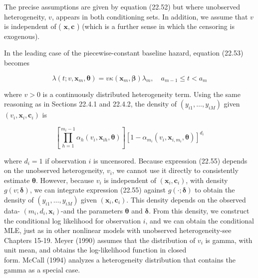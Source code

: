 \documentclass[10pt]{article}
\begin{document}
The precise assumptions are given by equation (22.52) but where unobserved heterogeneity, $v$, appears in both conditioning sets. In addition, we assume that $v$ is independent of ( $\mathbf{x}, \mathbf{c}$ ) (which is a further sense in which the censoring is exogenous).

In the leading case of the piecewise-constant baseline hazard, equation (22.53) becomes


\begin{equation*}
\lambda\left(t ; v, \mathbf{x}_{m}, \boldsymbol{\theta}\right)=v \kappa\left(\mathbf{x}_{m}, \boldsymbol{\beta}\right) \lambda_{m}, \quad a_{m-1} \leq t<a_{m} \tag{22.54}
\end{equation*}


where $v>0$ is a continuously distributed heterogeneity term. Using the same reasoning as in Sections 22.4.1 and 22.4.2, the density of $\left(y_{i 1}, \ldots, y_{i M}\right)$ given $\left(v_{i}, \mathbf{x}_{i}, \mathbf{c}_{i}\right)$ is


\begin{equation*}
\left[\prod_{h=1}^{m_{i}-1} \alpha_{h}\left(v_{i}, \mathbf{x}_{i h}, \boldsymbol{\theta}\right)\right]\left[1-\alpha_{m_{i}}\left(v_{i}, \mathbf{x}_{i, m_{i}}, \boldsymbol{\theta}\right)\right]^{d_{i}} \tag{22.55}
\end{equation*}


where $d_{i}=1$ if observation $i$ is uncensored. Because expression (22.55) depends on the unobserved heterogeneity, $v_{i}$, we cannot use it directly to consistently estimate $\boldsymbol{\theta}$. However, because $v_{i}$ is independent of $\left(\mathbf{x}_{i}, \mathbf{c}_{i}\right)$, with density $g(v ; \boldsymbol{\delta})$, we can integrate expression (22.55) against $g(\cdot ; \boldsymbol{\delta})$ to obtain the density of $\left(y_{i 1}, \ldots, y_{i M}\right)$ given $\left(\mathbf{x}_{i}, \mathbf{c}_{i}\right)$. This density depends on the observed data- $\left(m_{i}, d_{i}, \mathbf{x}_{i}\right)$-and the parameters $\boldsymbol{\theta}$ and $\boldsymbol{\delta}$. From this density, we construct the conditional log likelihood for observation $i$, and we can obtain the conditional MLE, just as in other nonlinear models with unobserved heterogeneity-see Chapters 15-19. Meyer (1990) assumes that the distribution of $v_{i}$ is gamma, with unit mean, and obtains the log-likelihood function in closed\\
form. McCall (1994) analyzes a heterogeneity distribution that contains the gamma as a special case.
\end{document}
